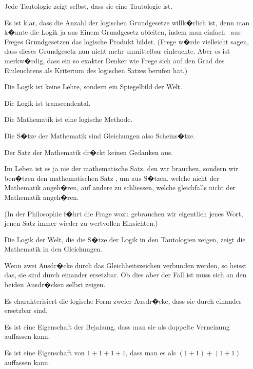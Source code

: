 \begin{propositions}
{Jede Tautologie zeigt selbst, dass sie eine
Tautologie ist.}


{Es ist klar, dass die Anzahl der \glqq{}logischen
Grundgesetze\grqq{} willk�rlich ist, denn man k�nnte
die Logik ja aus Einem Grundgesetz ableiten,
indem man einfach \zumBeispiel\ aus Freges Grundgesetzen
das logische Produkt bildet. (Frege w�rde
vielleicht sagen, dass dieses Grundgesetz nun
nicht mehr unmittelbar einleuchte. Aber es ist
merkw�rdig, dass ein so exakter Denker wie
Frege sich auf den Grad des Einleuchtens als
Kriterium des logischen Satzes berufen hat.)}


{Die Logik ist keine Lehre, sondern ein Spiegelbild
der Welt.

Die Logik ist transcendental.}


{Die Mathematik ist eine logische Methode.

Die S�tze der Mathematik sind Gleichungen
also Scheins�tze.}


{Der Satz der Mathematik dr�ckt keinen Gedanken
aus.}


{Im Leben ist es ja nie der mathematische Satz,
den wir brauchen, sondern wir ben�tzen den
mathematischen Satz , um aus S�tzen, welche
nicht der Mathematik angeh�ren, auf andere zu
schliessen, welche gleichfalls nicht der Mathematik
angeh�ren.

(In der Philosophie f�hrt die Frage \glqq{}wozu
gebrauchen wir eigentlich jenes Wort, jenen Satz\grqq{}
immer wieder zu wertvollen Einsichten.)}


{Die Logik der Welt, die die S�tze der Logik in
den Tautologien zeigen, zeigt die Mathematik in
den Gleichungen.}


{Wenn zwei Ausdr�cke durch das Gleichheitszeichen
verbunden werden, so heisst das, sie sind
durch einander ersetzbar. Ob dies aber der Fall ist
muss sich an den beiden Ausdr�cken selbst zeigen.

Es charakterisiert die logische Form zweier Ausdr�cke,
dass sie durch einander ersetzbar sind.}


{Es ist eine Eigenschaft der Bejahung, dass man
sie als doppelte Verneinung auffassen kann.

Es ist eine Eigenschaft von \glqq{}$1 + 1 + 1 + 1$\grqq{}, dass
man es als \glqq{}$(1 + 1) + (1 + 1)$\grqq{} auffassen kann.}



\end{propositions}
